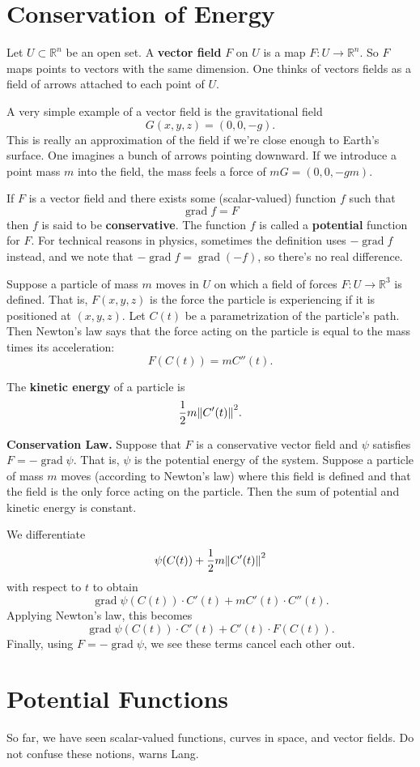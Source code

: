 \documentclass{article}
\DeclareMathOperator{\grd}{grad}
\begin{document}
\section*{Conservation of Energy}
Let $U \subset \mathbb{R}^n$ be an open set. A \textbf{vector field} $F$ on $U$ is a map 
$F: U \to \mathbb{R}^n$. So $F$ maps points to vectors with the same dimension. 
One thinks of vectors fields as a field of arrows attached to each point of $U$. 

A very simple example of a vector field is the gravitational field 
\[G(x,y,z) = (0,0,-g).\]
This is really an approximation of the field if we're close enough to 
Earth's surface. One imagines a bunch of arrows pointing downward. 
If we introduce a point mass $m$ into the
field, the mass feels a force of $mG = (0,0,-gm)$. 

If $F$ is a vector field and there exists some (scalar-valued) function $f$ such that
\[\grd f = F\]
then $f$ is said to be \textbf{conservative}. The function $f$ is called a \textbf{potential} function
for $F$. For technical reasons in physics, sometimes the definition uses
$-\grd f$ instead, and we note that $-\grd f = \grd(-f)$, so there's no real difference.

Suppose a particle of mass $m$ moves in $U$ on which a field of forces $F: U \to \mathbb{R}^3$ is defined.
That is, $F(x,y,z)$ is the force the particle is experiencing if it is positioned at $(x,y,z)$.
Let $C(t)$ be a parametrization of the particle's path. Then Newton's law says that the force acting on the 
particle is equal to the mass times its acceleration:
\[F(C(t)) = mC''(t).\]

The \textbf{kinetic energy} of a particle is 
\[\frac{1}{2} m \norm{C'(t)}^2.\]

\textbf{Conservation Law.} Suppose that $F$ is a conservative vector field and $\psi$ satisfies
$F = -\grd \psi$. That is, $\psi$ is the potential energy of the system. Suppose a particle of mass $m$ moves 
(according to Newton's law) where this field is defined and that the field is the only force acting on the particle. 
Then the sum of potential and kinetic energy is constant.

We differentiate
\[ \psi(C(t)) +  \frac{1}{2} m \norm{C'(t)}^2\]
with respect to $t$ to obtain 
\[ \grd\psi(C(t))\cdot C'(t) + m C'(t) \cdot C''(t). \]
Applying Newton's law, this becomes
\[ \grd\psi(C(t))\cdot C'(t) + C'(t) \cdot F(C(t)). \]
Finally, using $F = -\grd \psi$, we see these terms cancel each other out.

\section*{Potential Functions}

So far, we have seen scalar-valued functions, curves in space, and vector fields. Do not confuse these notions, warns
Lang.
\end{document}
